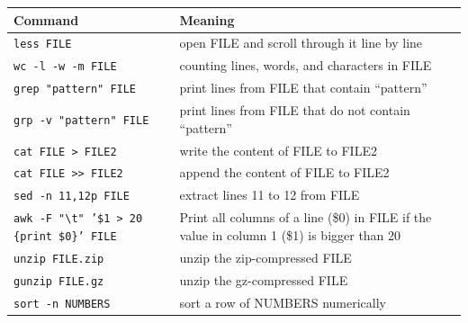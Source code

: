 \documentclass[11pt]{article}
\begin{document}
\begin{center}
\begin{tabular}{ll}
 Command                                                            &  Meaning                                                                                     \\
\hline
 \texttt{less FILE}                                                 &  open FILE and scroll through it line by line                                                \\
\hline
 \texttt{wc -l -w -m  FILE}                                         &  counting lines, words, and characters in FILE                                               \\
\hline
 \texttt{grep "pattern" FILE}                                       &  print lines from FILE that contain ``pattern''                                              \\
\hline
 \texttt{grp -v "pattern" FILE}                                     &  print lines from FILE that do not contain ``pattern''                                       \\
\hline
 \texttt{cat FILE > FILE2}                                          &  write the content of FILE to FILE2                                                          \\
\hline
 \texttt{cat FILE >> FILE2}                                         &  append the content of FILE to FILE2                                                         \\
\hline
 \texttt{sed -n 11,12p FILE}                                        &  extract lines 11 to 12 from FILE                                                            \\
\hline
 \texttt{awk -F "\textbackslash{}t" '\$1 > 20 \{print \$0\}' FILE}  &  Print all columns of a line (\$0) in FILE if the value in column 1 (\$1) is bigger than 20  \\
\hline
 \texttt{unzip FILE.zip}                                            &  unzip the zip-compressed FILE                                                               \\
\hline
 \texttt{gunzip FILE.gz}                                            &  unzip the gz-compressed FILE                                                                \\
\hline
 \texttt{sort -n  NUMBERS}                                          &  sort a row of NUMBERS numerically                                                           \\

\end{tabular}
\end{center}
\end{document}
